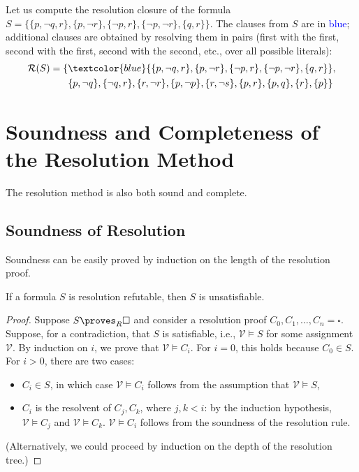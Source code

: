 \begin{example}
    Let us compute the resolution closure of the formula $S = \{\{p, \neg q, r\}, \{p, \neg r\}, \{\neg p, r\}, \{\neg p, \neg r\}, \{q, r\}\}$. The clauses from $S$ are in \textcolor{blue}{blue}; additional clauses are obtained by resolving them in pairs (first with the first, second with the first, second with the second, etc., over all possible literals):
    \begin{align*}
        \mathcal{R}(S) = \{&\textcolor{blue}{\{p, \neg q, r\}, \{p, \neg r\}, \{\neg p, r\}, \{\neg p, \neg r\}, \{q, r\}},\\ &\{p, \neg q\}, \{\neg q, r\}, \{r, \neg r\}, \{p, \neg p\}, \{r, \neg s\}, \{p, r\}, \{p, q\}, \{r\}, \{p\}\}
    \end{align*}
\end{example}

\section{Soundness and Completeness of the Resolution Method}

The resolution method is also both sound and complete. 

\subsection{Soundness of Resolution}

Soundness can be easily proved by induction on the length of the resolution proof.

\begin{theorem}\label{theorem:soundness-resolution}
If a formula $S$ is resolution refutable, then $S$ is unsatisfiable.
\end{theorem}
\begin{proof}
    Suppose $S \proves_R \square$ and consider a resolution proof $C_0, C_1, \dots, C_n = \square$. Suppose, for a contradiction, that $S$ is satisfiable, i.e., $\mathcal{V} \models S$ for some assignment $\mathcal{V}$. By induction on $i$, we prove that $\mathcal{V} \models C_i$. For $i = 0$, this holds because $C_0 \in S$. For $i > 0$, there are two cases:
    \begin{itemize}
        \item $C_i \in S$, in which case $\mathcal{V} \models C_i$ follows from the assumption that $\mathcal{V} \models S$,
        \item $C_i$ is the resolvent of $C_j, C_k$, where $j, k < i$: by the induction hypothesis, $\mathcal{V} \models C_j$ and $\mathcal{V} \models C_k$. $\mathcal{V} \models C_i$ follows from the soundness of the resolution rule.
    \end{itemize}
    (Alternatively, we could proceed by induction on the depth of the resolution tree.)
\end{proof}

